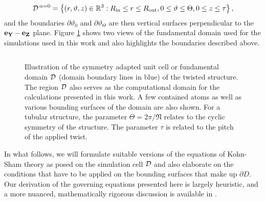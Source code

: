 \documentclass[preprint,12pt, 3p, sort&compress]{elsarticle}
\begin{document}
\begin{align}
{\cal D}^{\,\alpha = 0} =  \big\{(r,\vartheta,z) \in \mathbb{R}^3:R_{\text{in}} \leq r\leq R_{\text{out}},0 \leq \vartheta \leq \Theta, 0 \leq z \leq \tau\big\}\,,
\end{align}
and the boundaries $\partial\vartheta_{0}$ and $\partial\vartheta_{\Theta}$ are then vertical surfaces perpendicular to the ${\bf e}_{{\bf Y}}-{\bf e}_{{\bf Z}}$ plane. Figure \ref{fig:FD_Domain} shows two views of the fundamental domain used for the simulations used in this work and also highlights the boundaries described above.
\begin{figure}[ht]
\centering
{}$\;$
\caption{Illustration of the symmetry adapted unit cell or fundamental domain ${\cal D}$ (domain boundary lines in blue) of the twisted structure. The region ${\cal D}$ also serves as the computational domain for the calculations presented in this work. A few contained atoms as well as various bounding surfaces of the domain are also shown. For a tubular structure, the parameter $\Theta = 2\pi/\mathfrak{N}$ relates to the cyclic symmetry of the structure. The parameter $\tau$ is related to the pitch of the applied twist.}
\label{fig:FD_Domain}
\end{figure}
In what follows, we will formulate suitable versions of the equations of Kohn-Sham theory as posed on the simulation cell ${\cal D}$ and also elaborate on the conditions that have to be applied on the bounding surfaces that make up $\partial D$. Our derivation of the governing equations presented here is largely heuristic, and a more nuanced, mathematically rigorous discussion is available in \citep{banerjee2021ab}.
\end{document}
